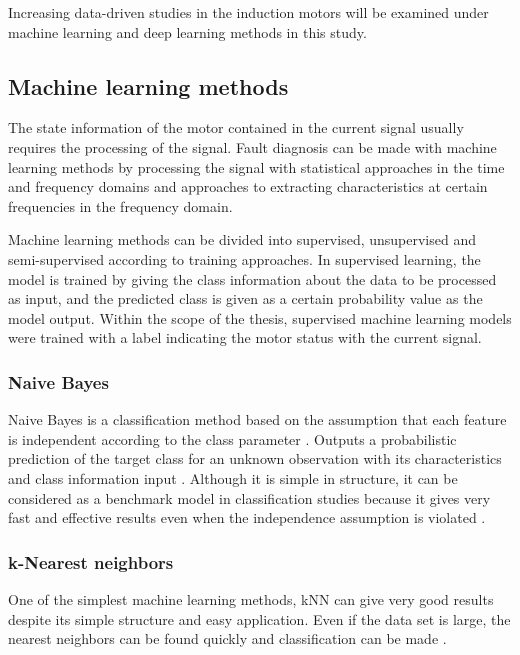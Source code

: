 Increasing data-driven studies in the induction motors will be examined under machine learning and deep learning methods in this study. 

\subsection{Machine learning methods}

The state information of the motor contained in the current signal usually requires the processing of the signal. Fault diagnosis can be made with machine learning methods by processing the signal with statistical approaches in the time and frequency domains and approaches to extracting characteristics at certain frequencies in the frequency domain. 

Machine learning methods can be divided into supervised, unsupervised and semi-supervised according to training approaches. In supervised learning, the model is trained by giving the class information about the data to be processed as input, and the predicted class is given as a certain probability value as the model output. Within the scope of the thesis, supervised machine learning models were trained with a label indicating the motor status with the current signal.

\subsubsection{Naive Bayes}

Naive Bayes is a classification method based on the assumption that each feature is independent according to the class parameter \cite{friedman1997bayesian}. Outputs a probabilistic prediction of the target class for an unknown observation with its characteristics and class information input \cite{lowd2005naive}. Although it is simple in structure, it can be considered as a benchmark model in classification studies because it gives very fast and effective results even when the independence assumption is violated \cite{martin2018experimental}. 

\subsubsection{k-Nearest neighbors}

One of the simplest machine learning methods, kNN can give very good results despite its simple structure and easy application. Even if the data set is large, the nearest neighbors can be found quickly and classification can be made \cite{shalev2014understanding}.

